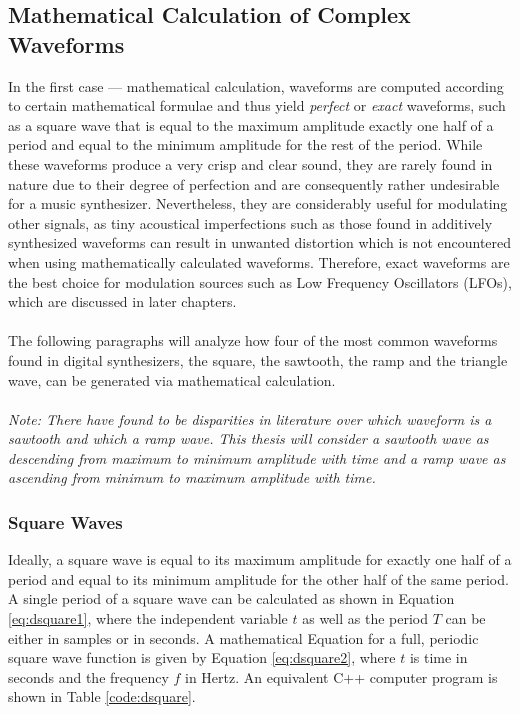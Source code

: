   \subsection{Mathematical Calculation of Complex Waveforms}

  In the first case --- mathematical calculation, waveforms are computed according to certain mathematical formulae and thus yield \emph{perfect} or \emph{exact} waveforms, such as a square wave that is equal to the maximum amplitude exactly one half of a period and equal to the minimum amplitude for the rest of the period. While these waveforms produce a very crisp and clear sound, they are rarely found in nature due to their degree of perfection and are consequently rather undesirable for a music synthesizer. Nevertheless, they are considerably useful for modulating other signals, as tiny acoustical imperfections such as those found in additively synthesized waveforms can result in unwanted distortion which is not encountered when using mathematically calculated waveforms. Therefore, exact waveforms are the best choice for modulation sources such as Low Frequency Oscillators (LFOs), which are discussed in later chapters. \\\\
  The following paragraphs will analyze how four of the most common waveforms found in digital synthesizers, the square, the sawtooth, the ramp and the triangle wave, can be generated via mathematical calculation.\\\\
  \emph{Note: There have found to be disparities in literature over which waveform is a sawtooth and which a ramp wave. This thesis will consider a sawtooth wave as descending from maximum to minimum amplitude with time and a ramp wave as ascending from minimum to maximum amplitude with time.}

  \subsubsection{Square Waves}

  Ideally, a square wave is equal to its maximum amplitude for exactly one half of a period and equal to its minimum amplitude for the other half of the same period. A single period of a square wave can be calculated as shown in Equation \ref{eq:dsquare1}, where the independent variable $t$ as well as the period $T$ can be either in samples or in seconds. A mathematical Equation for a full, periodic square wave function is given by Equation \ref{eq:dsquare2}, where $t$ is time in seconds and the frequency $f$ in Hertz. An equivalent C++ computer program is shown in Table \ref{code:dsquare}.


